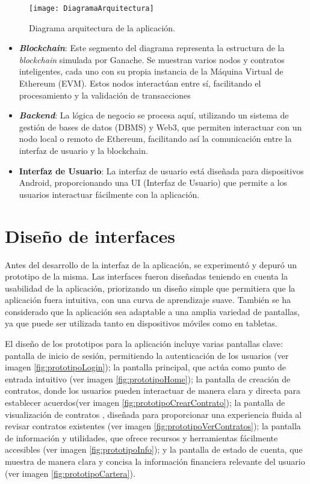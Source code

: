 \begin{figure}[h]
	\centering
	\texttt{[image: DiagramaArquitectura]}
	\caption[Diagrama arquitectura]{Diagrama arquitectura de la aplicación.}
	\label{fig:DiagramaArquitectura}
\end{figure}

\begin{itemize}
\item \textbf{\textit{Blockchain}}: Este segmento del diagrama representa la estructura de la \textit{blockchain} simulada por Ganache. Se muestran varios nodos y contratos inteligentes, cada uno con su propia instancia de la Máquina Virtual de Ethereum (EVM). Estos nodos interactúan entre sí, facilitando el procesamiento y la validación de transacciones

\item \textbf{\textit{Backend}}: La lógica de negocio se procesa aquí, utilizando un sistema de gestión de bases de datos (DBMS) y Web3, que permiten interactuar con un nodo local o remoto de Ethereum, facilitando así la comunicación entre la interfaz de usuario y la blockchain.

\item \textbf{Interfaz de Usuario}: La interfaz de usuario está diseñada para dispositivos Android, proporcionando una UI (Interfaz de Usuario) que permite a los usuarios interactuar fácilmente con la aplicación.
\end{itemize}

\section{Diseño de interfaces}

Antes del desarrollo de la interfaz de la aplicación, se experimentó y depuró un prototipo de la misma.
Las interfaces fueron diseñadas teniendo en cuenta la usabilidad de la aplicación, priorizando un diseño simple que permitiera que la aplicación fuera intuitiva, con una curva de aprendizaje suave.
También se ha considerado que la aplicación sea adaptable a una amplia variedad de pantallas, ya que puede ser utilizada tanto en dispositivos móviles como en tabletas.

El diseño de los prototipos para la aplicación incluye varias pantallas clave: pantalla de inicio de sesión, permitiendo la autenticación de los usuarios (ver imagen \ref{fig:prototipoLogin}); la pantalla principal, que actúa como punto de entrada intuitivo (ver imagen \ref{fig:prototipoHome}); la pantalla de creación de contratos, donde los usuarios pueden interactuar de manera clara y directa para establecer acuerdos(ver imagen \ref{fig:prototipoCrearContrato}); la pantalla de visualización de contratos , diseñada para proporcionar una experiencia fluida al revisar contratos existentes (ver imagen \ref{fig:prototipoVerContratos}); la pantalla de información y utilidades, que ofrece recursos y herramientas fácilmente accesibles (ver imagen \ref{fig:prototipoInfo}); y la pantalla de estado de cuenta, que muestra de manera clara y concisa la información financiera relevante del usuario (ver imagen \ref{fig:prototipoCartera}). 

